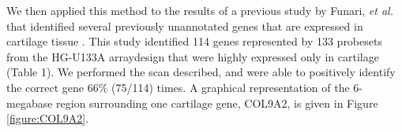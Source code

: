 \documentclass{bioinfo}
\begin{document}
We then applied this method to the results of a previous study by Funari,
\emph{et al.} that identified several previously unannotated genes that are
expressed in cartilage tissue \cite{funari}.  This study identified 114 genes
represented by 133 probesets from the HG-U133A arraydesign that were highly
expressed only in cartilage (Table 1).  We performed the scan described, and
were able to positively identify the correct gene 66\% (75/114) times.  A
graphical representation of the 6-megabase region surrounding one cartilage
gene, COL9A2, is given in Figure \ref{figure:COL9A2}.

%
%
%
\end{document}
